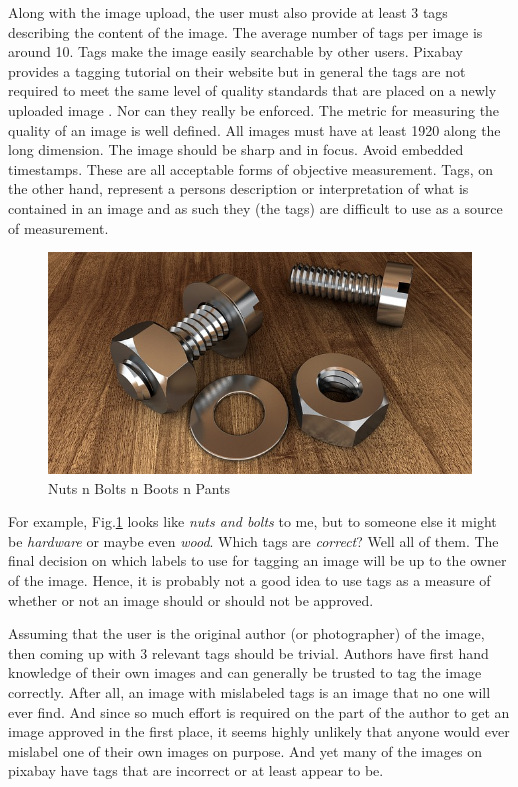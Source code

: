 \documentclass[10pt, a4paper, twocolumn]{article} %
\begin{document}
Along with the image upload, the user must also provide at least 3 tags describing the content of the image.  The average number of tags per image is around 10.  Tags make the image easily searchable by other users.  Pixabay provides a tagging tutorial on their website but in general the tags are not required to meet the same level of quality standards that are placed on a newly uploaded image \citep{Pixabay:ImgStandards}. Nor can they really be enforced.  The metric for measuring the quality of an image is well defined.  All images must have at least 1920 along the long dimension.  The image should be sharp and in focus.  Avoid embedded timestamps.  These are all acceptable forms of objective measurement.  Tags, on the other hand, represent a persons description or interpretation of what is contained in an image and as such they (the tags) are difficult to use as a source of measurement.
\begin{figure}
	\includegraphics[width=\linewidth]{screw-1924174_640.jpg} %
	\caption{Nuts n Bolts n Boots n Pants} %
	\label{screw-1924174_640} %
\end{figure}
For example, Fig.\ref{screw-1924174_640} looks like \textit{nuts and bolts} to me, but to someone else it might be \textit{hardware} or maybe even \textit{wood}.  Which tags are \textit{correct}?  Well all of them.  The final decision on which labels to use for tagging an image will be up to the owner of the image.  Hence, it is probably not a good idea to use tags as a measure of whether or not an image should or should not be approved.

Assuming that the user is the original author (or photographer) of the image, then coming up with 3 relevant tags should be trivial.  Authors have first hand knowledge of their own images and can generally be trusted to tag the image correctly.  After all, an image with mislabeled tags is an image that no one will ever find. And since so much effort is required on the part of the author to get an image approved in the first place, it seems highly unlikely that anyone would ever mislabel one of their own images on purpose.  And yet many of the images on pixabay have tags that are incorrect or at least appear to be.
\end{document}

